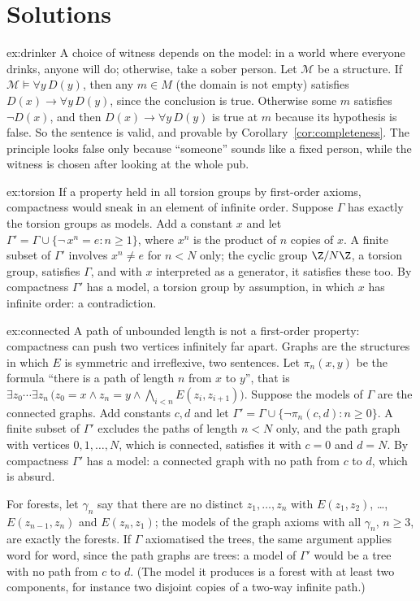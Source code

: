 \section{Solutions}

\begin{solution}{ex:drinker}
\idea A choice of witness depends on the model: in a world where everyone drinks, anyone will do; otherwise, take a sober person.
\writeup Let $\mathcal M$ be a structure. If $\mathcal M\models\forall y\,D(y)$, then any $m\in M$ (the domain is not empty) satisfies $D(x)\to\forall y\,D(y)$, since the conclusion is true. Otherwise some $m$ satisfies $\neg D(x)$, and then $D(x)\to\forall y\,D(y)$ is true at $m$ because its hypothesis is false. So the sentence is valid, and provable by Corollary~\ref{cor:completeness}. The principle looks false only because ``someone'' sounds like a fixed person, while the witness is chosen after looking at the whole pub.
\end{solution}

\begin{solution}{ex:torsion}
\idea If a property held in all torsion groups by first-order axioms, compactness would sneak in an element of infinite order.
\writeup Suppose $\Gamma$ has exactly the torsion groups as models. Add a constant $x$ and let $\Gamma'=\Gamma\cup\{\neg\,x^n=e:n\ge1\}$, where $x^n$ is the product of $n$ copies of $x$. A finite subset of $\Gamma'$ involves $x^n\ne e$ for $n<N$ only; the cyclic group $\Z/N\Z$, a torsion group, satisfies $\Gamma$, and with $x$ interpreted as a generator, it satisfies these too. By compactness $\Gamma'$ has a model, a torsion group by assumption, in which $x$ has infinite order: a contradiction.
\end{solution}

\begin{solution}{ex:connected}
\idea A path of unbounded length is not a first-order property: compactness can push two vertices infinitely far apart.
\writeup Graphs are the structures in which $E$ is symmetric and irreflexive, two sentences. Let $\pi_n(x,y)$ be the formula ``there is a path of length $n$ from $x$ to $y$'', that is $\exists z_0\cdots\exists z_n\,\bigl(z_0=x\land z_n=y\land\bigwedge_{i<n}E(z_i,z_{i+1})\bigr)$. Suppose the models of $\Gamma$ are the connected graphs. Add constants $c,d$ and let $\Gamma'=\Gamma\cup\{\neg\pi_n(c,d):n\ge0\}$. A finite subset of $\Gamma'$ excludes the paths of length $n<N$ only, and the path graph with vertices $0,1,\dots,N$, which is connected, satisfies it with $c=0$ and $d=N$. By compactness $\Gamma'$ has a model: a connected graph with no path from $c$ to $d$, which is absurd.

For forests, let $\gamma_n$ say that there are no distinct $z_1,\dots,z_n$ with $E(z_1,z_2)$, \dots, $E(z_{n-1},z_n)$ and $E(z_n,z_1)$; the models of the graph axioms with all $\gamma_n$, $n\ge3$, are exactly the forests. If $\Gamma$ axiomatised the trees, the same argument applies word for word, since the path graphs are trees: a model of $\Gamma'$ would be a tree with no path from $c$ to $d$. (The model it produces is a forest with at least two components, for instance two disjoint copies of a two-way infinite path.)
\end{solution}

